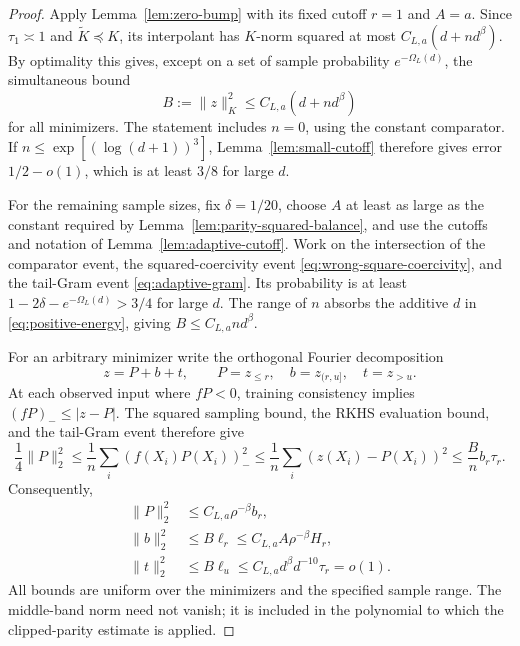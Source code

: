 \begin{proof}
Apply Lemma~\ref{lem:zero-bump} with its fixed cutoff $r=1$ and
$A=a$. Since $\tau_1\asymp1$ and $\widetilde K\preceq K$, its
interpolant has $K$-norm squared at most $C_{L,a}(d+nd^\beta)$.
By optimality this gives, except on a set of sample probability
$e^{-\Omega_L(d)}$, the simultaneous
bound
\begin{equation}\label{eq:positive-energy}
 B:=\|z\|_K^2\le C_{L,a}(d+nd^\beta)
\end{equation}
for all minimizers. The statement includes $n=0$, using the constant
comparator. If $n\le\exp[(\log(d+1))^3]$, Lemma~\ref{lem:small-cutoff}
therefore gives error $1/2-o(1)$, which is at least $3/8$ for large $d$.

For the remaining sample sizes, fix $\delta=1/20$, choose $A$ at least
as large as the constant required by
Lemma~\ref{lem:parity-squared-balance}, and use the cutoffs and notation
of Lemma~\ref{lem:adaptive-cutoff}. Work on the intersection of the
comparator event, the squared-coercivity event
\eqref{eq:wrong-square-coercivity}, and the tail-Gram event
\eqref{eq:adaptive-gram}. Its probability is at least
$1-2\delta-e^{-\Omega_L(d)}>3/4$ for large $d$.
The range of $n$ absorbs the additive $d$ in
\eqref{eq:positive-energy}, giving $B\le C_{L,a}nd^\beta$.

For an arbitrary minimizer write the orthogonal Fourier decomposition
\[
 z=P+b+t,\qquad P=z_{\le r},\quad
 b=z_{(r,u]},\quad t=z_{>u}.
\]
At each observed input where $fP<0$, training consistency implies
$(fP)_-\le|z-P|$. The squared sampling bound, the RKHS evaluation
bound, and the tail-Gram event therefore give
\[
 \frac14\|P\|_2^2
 \le\frac1n\sum_i(f(X_i)P(X_i))_-^2
 \le\frac1n\sum_i(z(X_i)-P(X_i))^2
 \le\frac Bn b_r\tau_r.
\]
Consequently,
\begin{align}
 \|P\|_2^2&\le C_{L,a}\rho^{-\beta}b_r,
       \label{eq:positive-head}\\
 \|b\|_2^2&\le B\ell_r
       \le C_{L,a}A\rho^{-\beta}H_r,
       \label{eq:positive-band}\\
 \|t\|_2^2&\le B\ell_u
       \le C_{L,a}d^\beta d^{-10}\tau_r=o(1).
       \label{eq:positive-tail}
\end{align}
All bounds are uniform over the minimizers and the specified sample
range. The middle-band norm need not vanish; it is included in the
polynomial to which the clipped-parity estimate is applied.


\end{proof}
